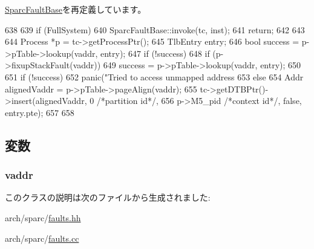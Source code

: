 \hyperlink{classSparcISA_1_1SparcFaultBase_a2bd783b42262278d41157d428e1f8d6f}{SparcFaultBase}を再定義しています。


\begin{DoxyCode}
638 {
639     if (FullSystem) {
640         SparcFaultBase::invoke(tc, inst);
641         return;
642     }
643 
644     Process *p = tc->getProcessPtr();
645     TlbEntry entry;
646     bool success = p->pTable->lookup(vaddr, entry);
647     if (!success) {
648         if (p->fixupStackFault(vaddr))
649             success = p->pTable->lookup(vaddr, entry);
650     }
651     if (!success) {
652         panic("Tried to access unmapped address %
653     } else {
654         Addr alignedVaddr = p->pTable->pageAlign(vaddr);
655         tc->getDTBPtr()->insert(alignedVaddr, 0 /*partition id*/,
656                 p->M5_pid /*context id*/, false, entry.pte);
657     }
658 }
\end{DoxyCode}


\subsection{変数}
\hypertarget{classSparcISA_1_1FastDataAccessMMUMiss_a9f933b300ef63eea367ca82f8da31025}{
\subsubsection[{vaddr}]{ {\bf vaddr}}}
\label{classSparcISA_1_1FastDataAccessMMUMiss_a9f933b300ef63eea367ca82f8da31025}


このクラスの説明は次のファイルから生成されました:\begin{DoxyCompactItemize}
\item 
arch/sparc/\hyperlink{arch_2sparc_2faults_8hh}{faults.hh}\item 
arch/sparc/\hyperlink{arch_2sparc_2faults_8cc}{faults.cc}\end{DoxyCompactItemize}
